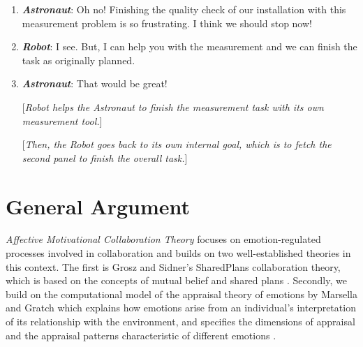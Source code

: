 \documentclass[12pt]{report}
\begin{document}
\begin{enumerate}
  \item \textit{\textbf{Astronaut}}: Oh no! Finishing the quality check of our
  installation with this measurement problem is so frustrating. I think we
  should stop now!

  \item \textit{\textbf{Robot}}: I see. But, I can help you with the measurement and we
  can finish the task as originally planned.

  \item \textit{\textbf{Astronaut}}: That would be great!

  [\textit{Robot helps the Astronaut to finish the measurement task with its
  own measurement tool.}]
  
  [\textit{Then, the Robot goes back to its own internal goal, which is to fetch
  the second panel to finish the overall task.}]

\end{enumerate}

\section{General Argument}

\textit{Affective Motivational Collaboration Theory} focuses on
emotion-regulated processes involved in collaboration and builds on two
well-established theories in this context. The first is Grosz and Sidner's
SharedPlans collaboration theory, which is based on the concepts of mutual
belief and shared plans \cite{grosz:shared-plans, grosz:plans-discourse}.
Secondly, we build on the computational model of the appraisal theory of
emotions by Marsella and Gratch \cite{gratch:domain-independent,
gratch:evaluating, marsella:ema-process-model, marsella:computational} which
explains how emotions arise from an individual's interpretation of its
relationship with the environment, and specifies the dimensions of appraisal and
the appraisal patterns characteristic of different emotions
\cite{scherer:appraisal-processes}.
\end{document}
